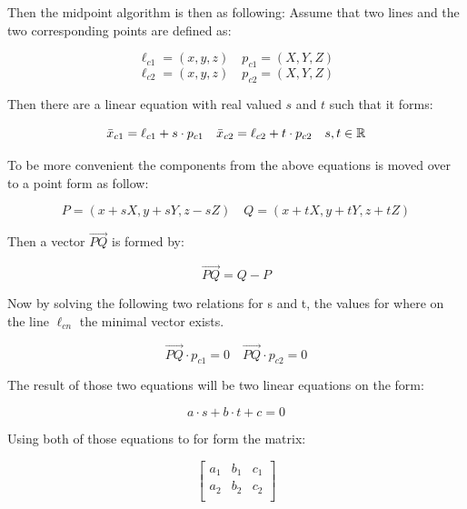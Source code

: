 Then the midpoint algorithm is then as following:
Assume that two lines and the two corresponding points are defined as:

\begin{equation}
    \ell_{c1} = (x,y,z) \quad p_{c1} = (X,Y,Z)
\end{equation}
\begin{equation}
    \ell_{c2} = (x,y,z) \quad p_{c2} = (X,Y,Z)
\end{equation}

Then there are a linear equation with real valued $s$ and $t$ such that it forms:

\begin{equation}
    \bar x_{c1} = \ell_{c1} + s\cdot p_{c1} \quad \bar x_{c2} = \ell_{c2} + t\cdot p_{c2}\quad s,t\in \mathbb{R}
\end{equation}

To be more convenient the components from the above equations is moved over to a point form as follow:

\begin{equation}
    P = (x+sX, y+sY,z-sZ)\quad
    Q = (x+tX, y+tY,z+tZ)
\end{equation}

Then a vector $\overrightarrow {PQ}$ is formed by:

\begin{equation}
    \overrightarrow {PQ} = Q - P
\end{equation}

Now by solving the following two relations for s and t, the values for where on the line $\ell_{cn}$ the minimal vector exists.

\begin{equation}
    \overrightarrow{PQ}\cdot p_{c1}=0 \quad  \overrightarrow{PQ}\cdot p_{c2} = 0
\end{equation}

The result of those two equations will be two linear equations on the form:

\begin{equation}
    a\cdot s + b\cdot t + c = 0
\end{equation}

Using both of those equations to for form the matrix:

\begin{equation}
    \begin{bmatrix}
        a_1 & b_1 & c_1\\
        a_2 & b_2 & c_2\\
    \end{bmatrix}
\end{equation}

